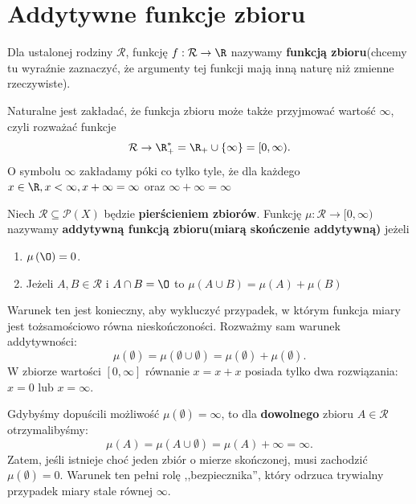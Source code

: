 \section{Addytywne funkcje zbioru}

\begin{definition}
	Dla ustalonej rodziny $\mathcal{R}$, funkcję $f: \mathcal{R}\rightarrow \R$ nazywamy \textbf{funkcją zbioru}(chcemy tu wyraźnie zaznaczyć, że argumenty tej funkcji mają inną naturę niż zmienne rzeczywiste).

	Naturalne jest zakładać, że funkcja zbioru może także przyjmować wartość $\infty$, czyli rozważać funkcje
	\[
		\mathcal{R}\rightarrow \R_{+}^{\ast} = \R_{+} \cup \{\infty\} = [0,\infty)
	.\] 
	O symbolu $\infty$ zakładamy póki co tylko tyle, że dla każdego $x\in \R, x<\infty, x+\infty = \infty$ oraz $\infty + \infty = \infty$
\end{definition} 

\begin{definition}
	Niech $\mathcal{R}\subseteq \mathcal{P}(X) $ będzie \textbf{pierścieniem zbiorów}. Funkcję $\mu : \mathcal{R}\rightarrow [0,\infty)$ nazywamy \textbf{addytywną funkcją zbioru(miarą skończenie addytywną)} jeżeli
	\begin{enumerate}[label=\arabic*)]
		\item $\mu \left( \O \right) = 0$.
		\item Jeżeli $ A,B \in \mathcal{R}$ i $A\cap B= \O$ to $\mu \left(A\cup B  \right) = \mu \left( A \right) + \mu \left( B \right) $
	\end{enumerate}
\end{definition} 
\begin{remark}[Dlaczego wymagamy, by $\mu(\emptyset) = 0$?]
    Warunek ten jest konieczny, aby wykluczyć przypadek, w którym funkcja miary jest tożsamościowo równa nieskończoności. Rozważmy sam warunek addytywności:
    \[
        \mu(\emptyset) = \mu(\emptyset \cup \emptyset) = \mu(\emptyset) + \mu(\emptyset).
    \]
    W zbiorze wartości $[0, \infty]$ równanie $x = x + x$ posiada tylko dwa rozwiązania: $x=0$ lub $x=\infty$.
    
    Gdybyśmy dopuścili możliwość $\mu(\emptyset) = \infty$, to dla \textbf{dowolnego} zbioru $A \in \mathcal{R}$ otrzymalibyśmy:
    \[
        \mu(A) = \mu(A \cup \emptyset) = \mu(A) + \infty = \infty.
    \]
    Zatem, jeśli istnieje choć jeden zbiór o mierze skończonej, musi zachodzić $\mu(\emptyset) = 0$. Warunek ten pełni rolę ,,bezpiecznika'', który odrzuca trywialny przypadek miary stale równej $\infty$.
\end{remark}

